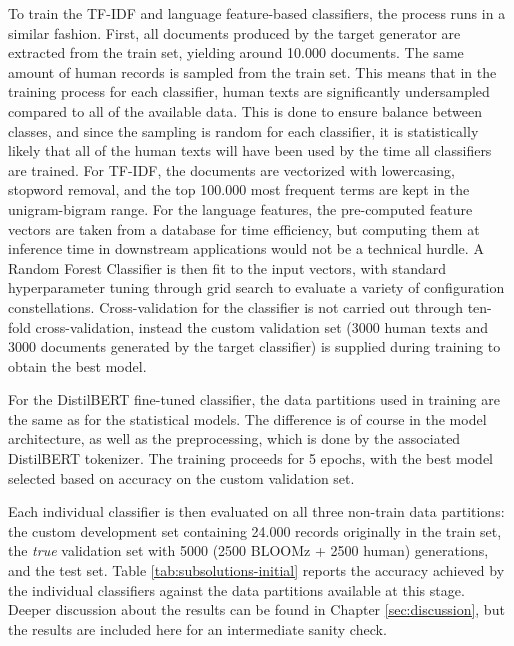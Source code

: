 To train the TF-IDF and language feature-based classifiers, the process runs in a similar fashion.
First, all documents produced by the target generator are extracted from the train set, yielding around 10.000 documents.
The same amount of human records is sampled from the train set.
This means that in the training process for each classifier, human texts are significantly undersampled compared to all of the available data.
This is done to ensure balance between classes, and since the sampling is random for each classifier, it is statistically likely that all of the human texts will have been used by the time all classifiers are trained.
For TF-IDF, the documents are vectorized with lowercasing, stopword removal, and the top 100.000 most frequent terms are kept in the unigram-bigram range.
For the language features, the pre-computed feature vectors are taken from a database for time efficiency, but computing them at inference time in downstream applications would not be a technical hurdle.
A Random Forest Classifier is then fit to the input vectors, with standard hyperparameter tuning through grid search to evaluate a variety of configuration constellations.
Cross-validation for the classifier is not carried out through ten-fold cross-validation, instead the custom validation set (3000 human texts and 3000 documents generated by the target classifier) is supplied during training to obtain the best model.

For the DistilBERT fine-tuned classifier, the data partitions used in training are the same as for the statistical models.
The difference is of course in the model architecture, as well as the preprocessing, which is done by the associated DistilBERT tokenizer.
The training proceeds for 5 epochs, with the best model selected based on accuracy on the custom validation set.

Each individual classifier is then evaluated on all three non-train data partitions: the custom development set containing 24.000 records originally in the train set, the \emph{true} validation set with 5000 (2500 BLOOMz + 2500 human) generations, and the test set.
Table \ref{tab:subsolutions-initial} reports the accuracy achieved by the individual classifiers against the data partitions available at this stage.
Deeper discussion about the results can be found in Chapter \ref{sec:discussion}, but the results are included here for an intermediate sanity check.

